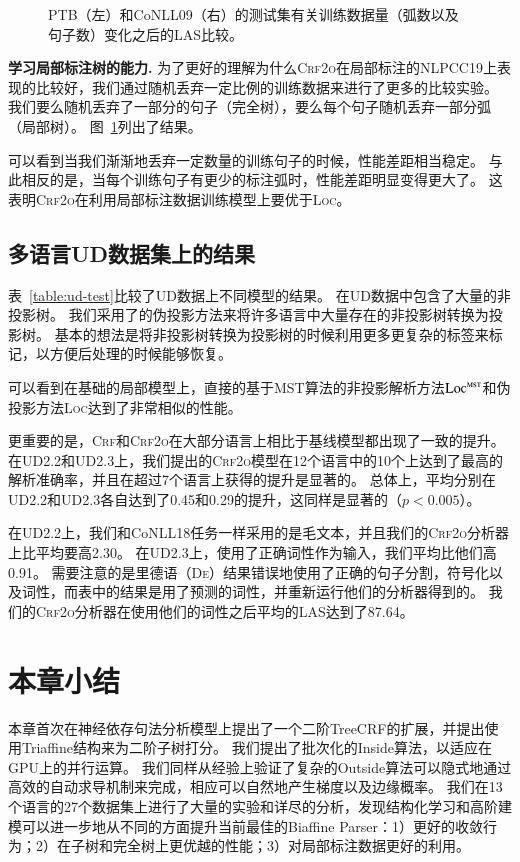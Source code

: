 \begin{figure}[tb!]
\begin{subfigure}[b]{0.4\textwidth}
	\end{subfigure}
	\caption{
		PTB（左）和CoNLL09（右）的测试集有关训练数据量（弧数以及句子数）变化之后的LAS比较。
	}
	\label{fig:part-gap}
\end{figure}

\noindent\textbf{学习局部标注树的能力.}
为了更好的理解为什么\textsc{Crf2o}在局部标注的NLPCC19上表现的比较好，我们通过随机丢弃一定比例的训练数据来进行了更多的比较实验。
我们要么随机丢弃了一部分的句子（完全树），要么每个句子随机丢弃一部分弧（局部树）。
图~\ref{fig:part-gap}列出了结果。

可以看到当我们渐渐地丢弃一定数量的训练句子的时候，性能差距相当稳定。
与此相反的是，当每个训练句子有更少的标注弧时，性能差距明显变得更大了。
这表明\textsc{Crf2o}在利用局部标注数据训练模型上要优于\textsc{Loc}。



\subsection{多语言UD数据集上的结果}

表~\ref{table:ud-test}比较了UD数据上不同模型的结果。
在UD数据中包含了大量的非投影树。
我们采用了\citet{nivre-nilsson-2005-pseudo}的伪投影方法来将许多语言中大量存在的非投影树转换为投影树。
基本的想法是将非投影树转换为投影树的时候利用更多更复杂的标签来标记，以方便后处理的时候能够恢复。

可以看到在基础的局部模型上，直接的基于MST算法的非投影解析方法$\textsc{Loc}^{\textsc{mst}}$和伪投影方法\textsc{Loc}达到了非常相似的性能。

更重要的是，\textsc{Crf}和\textsc{Crf2o}在大部分语言上相比于基线模型都出现了一致的提升。
在UD2.2和UD2.3上，我们提出的\textsc{Crf2o}模型在12个语言中的10个上达到了最高的解析准确率，并且在超过7个语言上获得的提升是显著的。
总体上，平均分别在UD2.2和UD2.3各自达到了0.45和0.29的提升，这同样是显著的（$p<0.005$）。

在UD2.2上，我们和CoNLL18任务一样采用的是毛文本，并且我们的\textsc{Crf2o}分析器上比\citet{ji-etal-2019-graph}平均要高2.30。
在UD2.3上，\citet{zhang-etal-2019-empirical}使用了正确词性作为输入，我们平均比他们高0.91。
需要注意的是\citet{ji-etal-2019-graph}里德语（\textsc{De}）结果错误地使用了正确的句子分割，符号化以及词性，而表中的结果是用了预测的词性，并重新运行他们的分析器得到的。
我们的\textsc{Crf2o}分析器在使用他们的词性之后平均的LAS达到了87.64。

\section{本章小结}
\label{sec:dep-conclusions}

本章首次在神经依存句法分析模型上提出了一个二阶TreeCRF的扩展，并提出使用Triaffine结构来为二阶子树打分。
我们提出了批次化的Inside算法，以适应在GPU上的并行运算。
我们同样从经验上验证了复杂的Outside算法可以隐式地通过高效的自动求导机制来完成，相应可以自然地产生梯度以及边缘概率。
我们在13个语言的27个数据集上进行了大量的实验和详尽的分析，发现结构化学习和高阶建模可以进一步地从不同的方面提升当前最佳的Biaffine Parser：1）更好的收敛行为；2）在子树和完全树上更优越的性能；3）对局部标注数据更好的利用。
